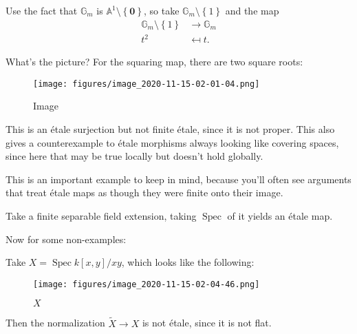 \begin{example}

Use the fact that \({\mathbb{G}}_m\) is
\({\mathbb{A}}^1\setminus\left\{{\mathbf{0}}\right\}\), so take
\({\mathbb{G}}_m \setminus\left\{{1}\right\}\) and the map
\begin{align*}  
{\mathbb{G}}_m\setminus\left\{{1}\right\} &\to {\mathbb{G}}_m \\
t^2 &\mapsfrom t
.\end{align*}

What's the picture? For the squaring map, there are two square roots:

\begin{figure}
\centering
\texttt{[image: figures/image\_2020-11-15-02-01-04.png]}
\caption{Image}
\end{figure}

This is an étale surjection but not finite étale, since it is not
proper. This also gives a counterexample to étale morphisms always
looking like covering spaces, since here that may be true locally but
doesn't hold globally.

\end{example}

\begin{warnings}

This is an important example to keep in mind, because you'll often see
arguments that treat étale maps as though they were finite onto their
image.

\end{warnings}

\begin{example}[?]

Take a finite separable field extension, taking \(\operatorname{Spec}\)
of it yields an étale map.

\end{example}

Now for some non-examples:

\begin{example}

Take \(X = \operatorname{Spec}k[x, y] / xy\), which looks like the
following:

\begin{figure}
\centering
\texttt{[image: figures/image\_2020-11-15-02-04-46.png]}
\caption{\(X\)}
\end{figure}

Then the normalization \(\tilde X\to X\) is not étale, since it is not
flat.

\end{example}

